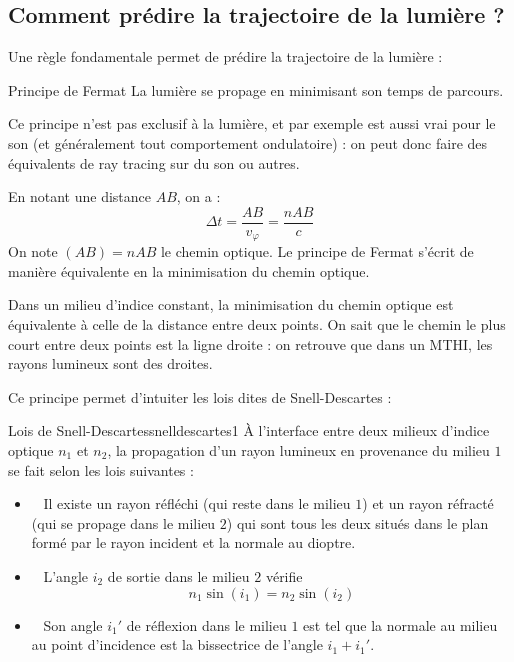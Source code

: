 \documentclass{classe}
\begin{document}
\subsection{Comment prédire la trajectoire de la lumière ?}
Une règle fondamentale permet de prédire la trajectoire de la lumière :
\begin{théorème}{Principe de Fermat}{}
La lumière se propage en minimisant son temps de parcours.
\end{théorème}
\begin{remarque}{}{}
Ce principe n'est pas exclusif à la lumière, et par exemple est aussi vrai pour le son (et généralement tout comportement ondulatoire) : on peut donc faire des équivalents de ray tracing sur du son ou autres.
\end{remarque}{}{}
En notant une distance $AB$, on a :
\begin{equation*}
	\Delta t = \frac{AB}{v_\varphi} = \frac{nAB}{c}
\end{equation*}
On note $(AB) = nAB$ le chemin optique. Le principe de Fermat s'écrit de manière équivalente en la minimisation du chemin optique.\\
\begin{remarque}{}{}
	Dans un milieu d'indice constant, la minimisation du chemin optique est équivalente à celle de la distance entre deux points. On sait que le chemin le plus court entre deux points est la ligne droite : on retrouve que dans un MTHI, les rayons lumineux sont des droites.
\end{remarque}
Ce principe permet d'intuiter les lois dites de Snell-Descartes :
\begin{théorème}{Lois de Snell-Descartes}{snelldescartes1}
À l'interface entre deux milieux d'indice optique $n_1$ et $n_2$, la propagation d'un rayon lumineux en provenance du milieu $1$ se fait selon les lois suivantes :
\begin{itemize}
	\item\color{vulm}{Plan d'incidence :}\ \color{black} Il existe un rayon réfléchi (qui reste dans le milieu $1$) et un rayon réfracté (qui se propage dans le milieu $2$) qui sont tous les deux situés dans le plan formé par le rayon incident et la normale au dioptre.
	\item \color{vulm}{Réfraction :}\ \color{black} L'angle $i_{2}$ de sortie dans le milieu $2$ vérifie \[n_{1}\sin{\left(i_{1}\right)} = n_{2}\sin{\left(i_{2}\right)}\]
    \item \color{vulm}{Réflexion :}\ \color{black} Son angle $i_{1}'$ de réflexion dans le milieu $1$ est tel que la normale au milieu au point d'incidence est la bissectrice de l'angle $i_{1} + i_{1}'$.
\end{itemize}
\end{théorème}
\end{document}
